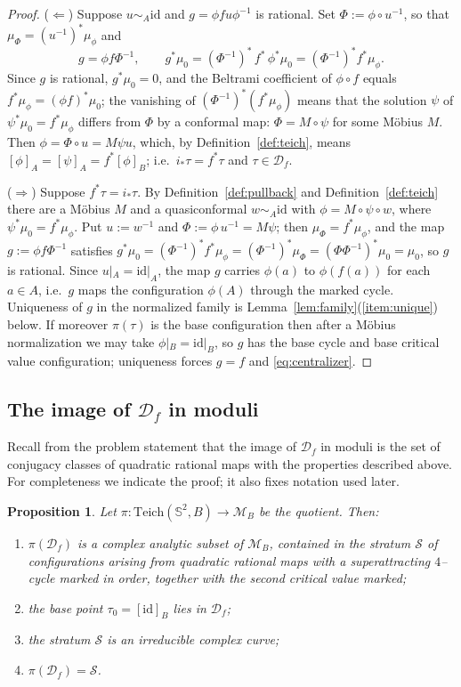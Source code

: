 \documentclass[11pt]{amsart}
\theoremstyle{plain}
\newtheorem{proposition}[theorem]{Proposition}
\theoremstyle{definition}
\newcommand{\Sph}{\mathbb{S}^2}
\newcommand{\Teich}{\mathrm{Teich}}
\newcommand{\D}{\mathcal{D}}
\newcommand{\M}{\mathcal{M}}
\newcommand{\S}{\mathcal{S}}
\newcommand{\id}{\mathrm{id}}
\begin{document}
\begin{proof}
($\Leftarrow$) Suppose $u\sim_A\id$ and $g=\phi f u\phi^{-1}$ is rational.
Set $\Phi:=\phi\circ u^{-1}$, so that
$\mu_\Phi=(u^{-1})^{*}\mu_\phi$ and
$$g=\phi f \Phi^{-1},\qquad
g^{*}\mu_0=(\Phi^{-1})^{*}\, f^{*}\,\phi^{*}\mu_0=(\Phi^{-1})^{*}f^{*}\mu_\phi .$$
Since $g$ is rational, $g^{*}\mu_0=0$, and the Beltrami coefficient of
$\phi\circ f$ equals $f^{*}\mu_\phi=(\phi f)^{*}\mu_0$; the vanishing of
$(\Phi^{-1})^{*}(f^{*}\mu_\phi)$ means that the solution $\psi$ of
$\psi^{*}\mu_0=f^{*}\mu_\phi$ differs from $\Phi$ by a conformal map:
$\Phi=M\circ\psi$ for some M\"obius $M$.  Then
$\phi = \Phi\circ u = M\psi u$, which, by
Definition~\ref{def:teich}, means $[\phi]_A=[\psi]_A=f^{*}[\phi]_B$; i.e.\
$i_*\tau=f^{*}\tau$ and $\tau\in\D_f$.

($\Rightarrow$) Suppose $f^{*}\tau=i_*\tau$.  By
Definition~\ref{def:pullback} and Definition~\ref{def:teich} there are a
M\"obius $M$ and a quasiconformal $w\sim_A\id$ with $\phi=M\circ\psi\circ w$,
where $\psi^{*}\mu_0=f^{*}\mu_\phi$.  Put $u:=w^{-1}$ and
$\Phi:=\phi\, u^{-1}=M\psi$; then $\mu_\Phi=f^{*}\mu_\phi$, and the map
$g:=\phi f\Phi^{-1}$ satisfies
$g^{*}\mu_0=(\Phi^{-1})^{*}f^{*}\mu_\phi=(\Phi^{-1})^{*}\mu_\Phi
=(\Phi\Phi^{-1})^{*}\mu_0=\mu_0$, so $g$ is rational.  Since
$u|_A=\id|_A$, the map $g$ carries $\phi(a)$ to $\phi(f(a))$ for each
$a\in A$, i.e.\ $g$ maps the configuration $\phi(A)$ through the marked
cycle.  Uniqueness of $g$ in the normalized family is
Lemma~\ref{lem:family}(\ref{item:unique}) below.  If moreover
$\pi(\tau)$ is the base configuration then after a M\"obius normalization
we may take $\phi|_B=\id|_B$, so $g$ has the base cycle and base critical
value configuration; uniqueness forces $g=f$ and \eqref{eq:centralizer}.
\end{proof}

\subsection{The image of \texorpdfstring{$\D_f$}{Df} in moduli}

Recall from the problem statement that the image of $\D_f$ in moduli is
the set of conjugacy classes of quadratic rational maps with the properties
described above.  For completeness we indicate the proof; it also fixes
notation used later.

\begin{proposition}\label{prop:image}
Let $\pi:\Teich(\Sph,B)\to\M_B$ be the quotient.  Then:
\begin{enumerate}
\item $\pi(\D_f)$ is a complex analytic subset of $\M_B$, contained in the
\emph{stratum} $\S$ of configurations arising from quadratic rational maps
with a superattracting $4$--cycle marked in order, together with the second
critical value marked;
\item the base point $\tau_0=[\id]_B$ lies in $\D_f$;
\item the stratum $\S$ is an irreducible complex curve;
\item $\pi(\D_f)=\S$.
\end{enumerate}
\end{proposition}
\end{document}
